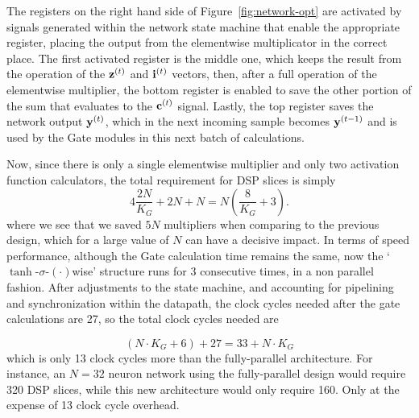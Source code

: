 The registers on the right hand side of Figure~\ref{fig:network-opt} are activated by signals generated within the network state machine that enable the appropriate
register, placing the output from the elementwise multiplicator in the correct place. The first activated register is the middle one, which keeps the result from the
operation of the $\mathbf{z}^{(t)}$ and $\mathbf{i}^{(t)}$ vectors, then, after a full operation of the elementwise multiplier, the bottom register is enabled to save the other portion of
the sum that evaluates to the $\mathbf{c}^{(t)}$ signal. Lastly, the top register saves the network output $\mathbf{y}^{(t)}$, which in the next incoming sample becomes $\mathbf{y}^{(t-1)}$
and is used by the Gate modules in this next batch of calculations.

Now, since there is only a single elementwise multiplier and only two activation function calculators, the total requirement for DSP slices is simply
\begin{equation}\label{eq:numdsp_network-opt}
    4\frac{2N}{K_G} + 2N + N = N \left( \frac{8}{K_G} + 3 \right).
\end{equation}
where we see that we saved $5N$ multipliers when comparing to the previous design, which for a large value of $N$ can have a decisive impact.
In terms of speed performance, although the Gate calculation time remains the same, now the `$\tanh$-$\sigma$-$(\cdot)$wise' structure runs
for 3 consecutive times, in a non parallel fashion. After adjustments to the state machine, and accounting for pipelining and synchronization
within the datapath, the clock cycles needed after the gate calculations are 27, so the total clock cycles needed are

\begin{equation}\label{eq:numcc_network-opt}
    (N \cdot K_G + 6) + 27  = 33 + N\cdot K_G
\end{equation}
which is only 13 clock cycles more than the fully-parallel architecture. For instance, an $N=32$ neuron network using the fully-parallel design would require 320 DSP slices,
while this new architecture would only require 160. Only at the expense of 13 clock cycle overhead.

